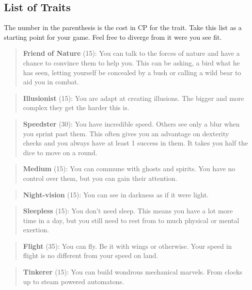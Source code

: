 \documentclass[11pt]{article}
\begin{document}
{\subsection{List of Traits}
\label{sec:org8237ddc}
The number in the parenthesis is the cost in CP for the trait. Take this list as a starting point for your game. Feel free to diverge from it were you see fit.

\begin{quote}
\textbf{Friend of Nature} (15): You can talk to the forces of nature and have a chance to convince them to help you. This can be asking, a bird what he has seen, letting yourself be concealed by a bush or calling a wild bear to aid you in combat.
\end{quote}

\begin{quote}
\textbf{Illusionist} (15): You are adapt at creating illusions. The bigger and more complex they get the harder this is.
\end{quote}

\begin{quote}
\textbf{Speedster} (30): You have incredible speed. Others see only a blur when you sprint past them. This often gives you an advantage on dexterity checks and you always have at least 1 success in them. It takes you half the dice to move on a round.
\end{quote}

\begin{quote}
\textbf{Medium} (15): You can commune with ghosts and spirits. You have no control over them, but you can gain their attention.
\end{quote}

\begin{quote}
\textbf{Night-vision} (15): You can see in darkness as if it were light.
\end{quote}

\begin{quote}
\textbf{Sleepless} (15): You don't need sleep. This means you have a lot more time in a day, but you still need to rest from to much physical or mental exertion.
\end{quote}

\begin{quote}
\textbf{Flight} (35): You can fly. Be it with wings or otherwise. Your speed in flight is no different from your speed on land.
\end{quote}

\begin{quote}
\textbf{Tinkerer} (15): You can build wondrous mechanical marvels. From clocks up to steam powered automatons. 
\end{quote}

}
\end{document}
